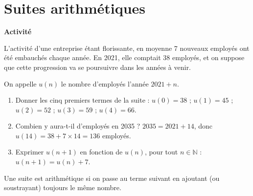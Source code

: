 \section{Suites arithmétiques}

\noindent\textbf{Activité}

L'activité d'une entreprise étant florissante, en moyenne 7 nouveaux employés ont été embauchés chaque année. En 2021, elle comptait 38 employés, et on suppose que cette progression va se poursuivre dans les années à venir.

On appelle $u(n)$ le nombre d'employés l'année $2021+n$.

\begin{enumerate}
    \item Donner les cinq premiers termes de la suite : \textcolor{J1}{$u(0)=38$ ; $u(1)=45$ ; $u(2)=52$ ; $u(3)=59$ ; $u(4)=66$.}
    \item Combien y aura-t-il d'employés en 2035 ? \textcolor{J1}{$2035=2021+14$, donc $u(14)=38+7\times14=136$ employés.}
    \item Exprimer $u(n+1)$ en fonction de $u(n)$, pour tout $n\in\mathbb{N}$ : \textcolor{J1}{$u(n+1)=u(n)+7$.}
\end{enumerate}

\bigskip

Une suite est arithmétique si on passe au terme suivant en ajoutant (ou soustrayant) toujours le même nombre.



